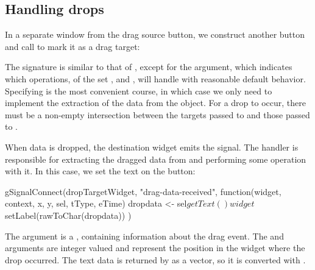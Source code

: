 \subsection{Handling drops}

In a separate window from the drag source button, we construct another
button and call  to mark it as a drag target:
\begin{Schunk}
\end{Schunk}
%
The signature is similar to that of ,
except for the  argument, which
indicates which operations, of the set , 
and , \GTK\/ will handle with reasonable default
behavior. Specifying  is the most convenient course, in
which case we only need to implement the extraction of the data from
the  object. For a drop to occur, there must be a
non-empty intersection between the targets passed to
 and those passed to
.

When data is dropped, the destination widget emits the
 signal. The handler is responsible for
extracting the dragged data from  and performing some
operation with it. In this case, we set the text on the button:
\begin{Schunk}
\begin{Sinput}
 gSignalConnect(dropTargetWidget, "drag-data-received", 
        function(widget, context, x, y, sel, tType, eTime) {
          dropdata <- sel$getText()
          widget$setLabel(rawToChar(dropdata))
        })
\end{Sinput}
\end{Schunk}
%
The  argument is a ,
containing information about the drag event. The  and
 arguments are integer valued and represent the position
in the widget where the drop occurred. The text data is returned by
 as a  vector, so it is converted with
.


